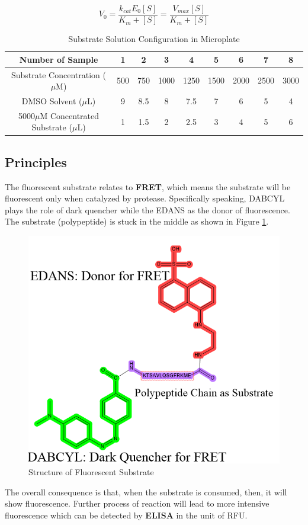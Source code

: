\documentclass{report}
\begin{document}
$$
V_0 =\frac{k_{cat}E_0[S]}{K_m+[S]}=\frac{V_{max}[S]}{K_m+[S]}
$$
\begin{table}
    \centering
    \begin{tabular}{|c|c|c|c|c|c|c|c|c|} \hline
        Number of Sample&1&2&3&4&5&6&7&8 \\ \hline
        Substrate Concentration ($\mu$M)&500&750&1000&1250&1500&2000&2500&3000 \\ \hline
        DMSO Solvent ($\mu$L)& 9&8.5&8&7.5&7&6&5&4\\ \hline
        5000$\mu$M Concentrated Substrate ($\mu$L)&1&1.5&2&2.5&3&4&5&6 \\ \hline
    \end{tabular}
    \caption{Substrate Solution Configuration in Microplate}
    \label{Substrate Solution Configuration in Microplate}
\end{table}

\subsection{Principles}
The fluorescent substrate relates to \textbf{FRET}, which means the substrate will be fluorescent only when catalyzed by protease.
Specifically speaking, DABCYL plays the role of dark quencher\cite{Quencher} while the EDANS\cite{EDANS} as the donor of fluorescence.
The substrate (polypeptide) is stuck in the middle as shown in Figure \ref{Structure of Fluorescent Substrate}.
\begin{figure}
    \centering
    \includegraphics[width=0.5\linewidth]{../Figures/fluorescent substrate.png}
    \caption{Structure of Fluorescent Substrate}
    \label{Structure of Fluorescent Substrate}
\end{figure}

The overall consequence is that, when the substrate is consumed, then, it will show fluorescence.
Further process of reaction will lead to more intensive fluorescence which can be detected by \textbf{ELISA} in the unit of RFU.
\end{document}
